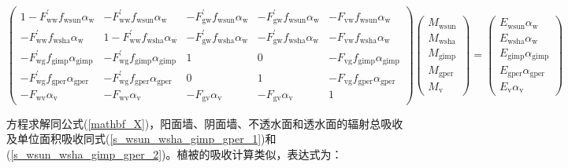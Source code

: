 \begin{landscape}
\begin{equation}
    \left(\begin{array}{ccccc}1-F_{\mathrm{ww}}^{\prime} f_{\mathrm{wsun}} \alpha_{\mathrm{w}} & -F_{\mathrm{ww}}^{\prime} f_{\mathrm{wsun}} \alpha_{\mathrm{w}} & -F_{\mathrm{g w}}^{\prime} f_{\mathrm{wsun}} \alpha_{\mathrm{w}} & -F_{\mathrm{g w}}^{\prime} f_{\mathrm{wsun}} \alpha_{\mathrm{w}} & -F_{\mathrm{v w}} f_{\mathrm{wsun}} \alpha_{\mathrm{w}} \\ -F_{\mathrm{ww}}^{\prime} f_{\mathrm{wsha}} \alpha_{\mathrm{w}} & 1-F_{\mathrm{ww}}^{\prime} f_{\mathrm{wsha}} \alpha_{\mathrm{w}} & -F_{\mathrm{g w}}^{\prime} f_{\mathrm{wsha}} \alpha_{\mathrm{w}} & -F_{\mathrm{g w}}^{\prime} f_{\mathrm{wsha}} \alpha_{\mathrm{w}} & -F_{\mathrm{v w}} f_{\mathrm{wsha}} \alpha_{\mathrm{w}} \\ -F_{\mathrm{w g}}^{\prime} f_{\mathrm{gimp}} \alpha_{\mathrm{gimp}} & -F_{\mathrm{w g}}^{\prime} f_{\mathrm{gimp}} \alpha_{\mathrm{gimp}} & 1 & 0 & -F_{\mathrm{v g}} f_{\mathrm{gimp}} \alpha_{\mathrm{gimp}} \\ -F_{\mathrm{w g}}^{\prime} f_{\mathrm{gper}} \alpha_{\mathrm{gper}} & -F_{\mathrm{w g}}^{\prime} f_{\mathrm{gper}} \alpha_{\mathrm{gper}} & 0 & 1 & -F_{\mathrm{v g}} f_{\mathrm{gper}} \alpha_{\mathrm{gper}} \\ -F_{\mathrm{w v}} \alpha_{\mathrm{v}} & -F_{\mathrm{w v}} \alpha_{\mathrm{v}} & -F_{\mathrm{g v}} \alpha_{\mathrm{v}} & -F_{\mathrm{g v}} \alpha_{\mathrm{v}} & 1\end{array}\right)\left(\begin{array}{c}M_{\mathrm{wsun}} \\ M_{\mathrm{wsha}} \\ M_{\mathrm{gimp}} \\ M_{\mathrm{gper}} \\ M_{\mathrm{v}}\end{array}\right)=\left(\begin{array}{c}E_{\mathrm{wsun}} \alpha_{\mathrm{w}} \\ E_{\mathrm{wsha}} \alpha_{\mathrm{w}} \\ E_{\mathrm{gimp}} \alpha_{\mathrm{gimp}} \\ E_{\mathrm{gper}} \alpha_{\mathrm{gper}} \\ E_{\mathrm{v}} \alpha_{\mathrm{v}}\end{array}\right)
  \end{equation}
\end{landscape}
方程求解同公式(\ref{mathbf_X})，阳面墙、阴面墙、不透水面和透水面的辐射总吸收及单位面积吸收同式(\ref{s_wsun_wsha_gimp_gper_1})和(\ref{s_wsun_wsha_gimp_gper_2})。植被的吸收计算类似，表达式为：
